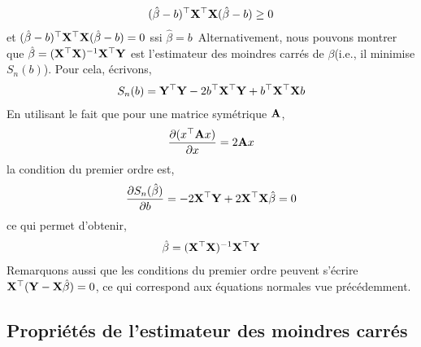 \begin{align*}
(\hat{\beta}-b)^\top \mathbf X ^\top\mathbf X  (\hat{\beta}-b) \geq 0
\end{align*}
et $(\hat{\beta}-b)^\top \mathbf X ^\top\mathbf X  (\hat{\beta}-b) = 0$ ssi $\hat{\beta} = b$\
Alternativement, nous pouvons montrer que $\hat{\beta}=(\mathbf X ^\top\mathbf X )^{-1}\mathbf X ^\top\mathbf Y$ est l'estimateur des moindres carrés de $\beta$(i.e., il minimise $S_n(b)$). Pour cela, écrivons,
\begin{align*}
S_n(b) = \mathbf Y^\top\mathbf Y - 2b^\top\mathbf X ^\top\mathbf Y+b^\top\mathbf X ^\top\mathbf X b
\end{align*}
En utilisant le fait que pour une matrice symétrique $\mathbf A$,
\begin{align*}
\frac{\partial (x^\top\mathbf A x)}{\partial x} = 2\mathbf A x
\end{align*}
la condition du premier ordre est,
\begin{align*}
\frac{\partial S_n(\hat{\beta})}{\partial b} = -2\mathbf X ^\top\mathbf Y + 2\mathbf X ^\top\mathbf X \hat{\beta} = 0
\end{align*}
ce qui permet d'obtenir,
\begin{align*}
\hat{\beta} = (\mathbf X ^\top\mathbf X )^{-1}\mathbf X ^\top\mathbf Y
\end{align*}
Remarquons aussi que les conditions du premier ordre peuvent s'écrire $\mathbf X ^\top(\mathbf Y - \mathbf X \hat{\beta}) = 0$, ce qui correspond aux équations normales vue précédemment.

\subsection{Propriétés de l'estimateur des moindres carrés}

